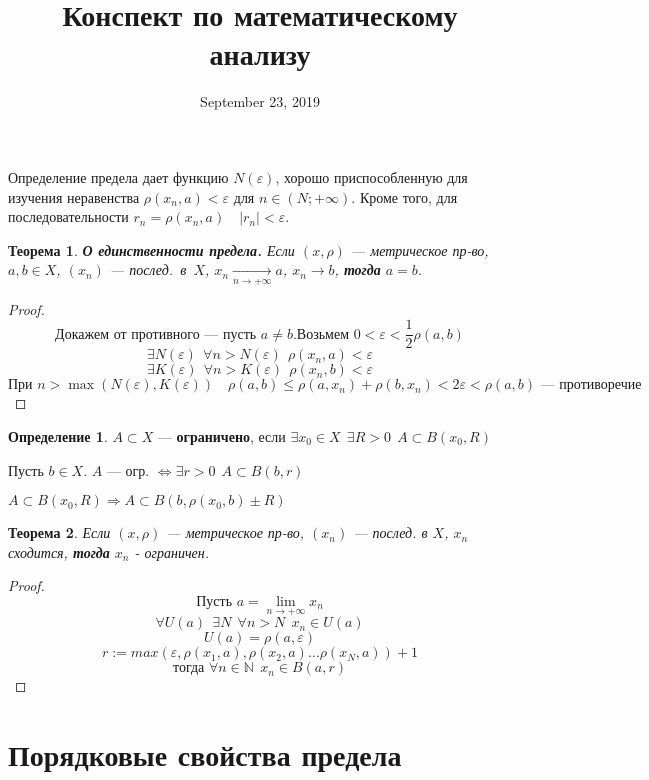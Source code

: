 \documentclass[12pt]{article}
\title{Конспект по математическому анализу}
\date{September 23, 2019}
\theoremstyle{plain}
\newtheorem{theorem}{Теорема}
\theoremstyle{remark}
\theoremstyle{definition}
\newtheorem*{definition}{Определение}
\begin{document}
\maketitle

Определение предела дает функцию $N(\varepsilon)$, хорошо приспособленную
для изучения неравенства $\rho(x_n,a)<\varepsilon$ для $n\in(N;+\infty)$.
Кроме того, для последовательности $r_n=\rho(x_n, a) \quad |r_n|<\varepsilon$.

\begin{theorem}
\textbf{О единственности предела.}
Если $(x,\rho)$ --- метрическое пр-во, $a,b\in X$, $(x_n)$ --- послед.~в~$X$,
$x_n\xrightarrow[n\to +\infty]{} a$, $x_n\to b$,
\textbf{тогда} $a=b$.
\end{theorem}

\begin{proof}
$$\text{Докажем от противного --- пусть }a\not =b. \text{Возьмем } 0<\varepsilon<\frac{1}{2}\rho(a,b)$$
$$\exists N(\varepsilon) \ \ \forall n>N(\varepsilon) \ \ \rho(x_n,a)<\varepsilon$$
$$\exists K(\varepsilon) \ \ \forall n>K(\varepsilon) \ \ \rho(x_n,b)<\varepsilon$$
$$\text{При } n>\max(N(\varepsilon),K(\varepsilon)) \quad \rho(a,b)\leq
\rho(a,x_n)+\rho(b,x_n)<2\varepsilon<\rho(a,b) \text{ --- противоречие}$$
\end{proof}

\begin{definition}
$A\subset X$ --- {\bf ограничено}, если $\exists x_0\in X \ \ \exists R>0 \ \ A\subset B(x_0, R)$
\end{definition}

Пусть $b\in X$. $A$ --- огр. $\Leftrightarrow \exists r>0 \ \ A\subset B(b,r)$

$A\subset B(x_0, R)\Rightarrow A\subset B(b,\rho(x_0,b)\pm R)$

\begin{theorem}
Если $(x,\rho)$ --- метрическое пр-во, $(x_n)$ --- послед. в $X$, $x_n$ сходится, \textbf{тогда} $x_n$ - ограничен.
\end{theorem}

\begin{proof}
$$\text{Пусть } a=\lim\limits_{n\to +\infty} x_n$$
$$\forall U(a) \ \ \exists N \ \ \forall n>N \ \ x_n\in U(a)$$
$$U(a)=\rho(a,\varepsilon) $$
$$r:=max(\varepsilon, \rho(x_1, a), \rho(x_2, a) \ldots \rho(x_N, a))+1 $$
$$\text{тогда } \forall n\in\mathbb{N} \ \ x_n\in B(a,r)$$
\end{proof}

\section*{Порядковые свойства предела}
\end{document}
